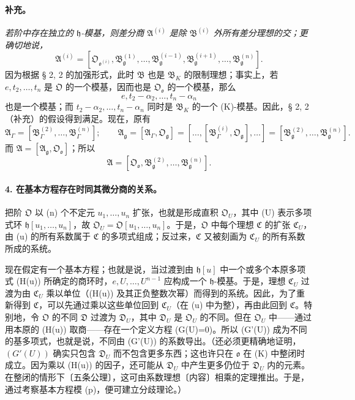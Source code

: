 \documentclass[11pt]{article}
\begin{document}
\paragraph{补充。}
\emph{若阶中存在独立的 \(\mathfrak h\)-模基，则差分商 \(\mathfrak A^{(i)}\) 是除 \(\mathfrak B^{(i)}\) 外所有差分理想的交；更确切地说，}
\[
\mathfrak A^{(i)}=
[\mathfrak O_{\mathfrak o^{(i)}},
\mathfrak B_{\mathfrak g}^{(1)},\ldots,
\mathfrak B_{\mathfrak g}^{(i-1)},
\mathfrak B_{\mathfrak g}^{(i+1)},\ldots,
\mathfrak B_{\mathfrak g}^{(n)}].
\]
因为根据 § 2, 2 的加强形式，此时 \(\mathfrak B\) 也是 \(\mathfrak B_K\) 的限制理想；事实上，若 \(e,t_2,\ldots,t_n\) 是 \(\mathfrak O\) 的一个模基，因而也是 \(\mathfrak O_{\mathfrak o}\) 的一个模基，那么
\[
e,t_2-\alpha_2,\ldots,t_n-\alpha_n
\]
也是一个模基；而 \(t_2-\alpha_2,\ldots,t_n-\alpha_n\) 同时是 \(\mathfrak B_K\) 的一个 (K)-模基。因此，§ 2, 2（补充）的假设得到满足。现在，原有
\[
\mathfrak A_\Gamma=[\mathfrak B_\Gamma^{(2)},\ldots,\mathfrak B_\Gamma^{(n)}];
\qquad
\mathfrak A_\mathfrak g=[\mathfrak A_\Gamma,\mathfrak O_\mathfrak g]
=[\ldots,[\mathfrak B_\Gamma^{(i)},\mathfrak O_\mathfrak g],\ldots]
=[\mathfrak B_\mathfrak g^{(2)},\ldots,\mathfrak B_\mathfrak g^{(n)}].
\]
而 \(\mathfrak A=[\mathfrak A_\mathfrak g,\mathfrak O_{\mathfrak o}]\)；所以
\[
\mathfrak A=[\mathfrak O_{\mathfrak o},\mathfrak B_\mathfrak g^{(2)},\ldots,\mathfrak B_\mathfrak g^{(n)}].
\]

\paragraph{4. 在基本方程存在时同其微分商的关系。}
把阶 \(\mathfrak O\) 以 (n) 个不定元 \(u_1,\ldots,u_n\) 扩张，也就是形成直积 \(\mathfrak O_U\)，其中 (U) 表示多项式环 \(\mathfrak h[u_1,\ldots,u_n]\)，故 \(\mathfrak O_U=\mathfrak O[u_1,\ldots,u_n]\)。于是，\(\mathfrak O\) 中每个理想 \(\mathfrak C\) 的扩张 \(\mathfrak C_U\)，由 (u) 的所有系数属于 \(\mathfrak C\) 的多项式组成；反过来，\(\mathfrak C\) 又被刻画为 \(\mathfrak C_U\) 的所有系数所成的系统。

现在假定有一个基本方程；也就是说，当过渡到由 \(\mathfrak h[u]\) 中一个或多个本原多项式 (H(u)) 所确定的商环时，\(e,U,\ldots,U^{n-1}\) 应构成一个 \(\mathfrak h\)-模基。于是，理想 \(\mathfrak C_U\) 过渡为由 \(\mathfrak C_U\) 乘以单位（(H(u)) 及其正负整数次幂）而得到的系统。因此，为了重新得到 \(\mathfrak C\)，可以先通过乘以这些单位回到 \(\mathfrak C_U\)（在 (u) 中为整），再由此回到 \(\mathfrak C\)。特别地，令 \(\mathfrak O\) 的不同 \(\mathfrak D\) 过渡为 \(\mathfrak D_U\)，其中 \(\mathfrak D_U\) 是 \(\mathfrak O_U\) 的不同。但在 \(\mathfrak O_U\) 中——通过用本原的 (H(u)) 取商——存在一个定义方程 (G(U)=0)。所以 (G'(U)) 成为不同的基多项式，也就是说，不同由 (G'(U)) 的系数导出。（还必须更精确地证明，\((G'(U))\) 确实只包含 \(\mathfrak D_U\) 而不包含更多东西；这也许只在 \(\mathfrak o\) 在 (K) 中整闭时成立。因为乘以 (H(u)) 的因子，还可能从 \(\mathfrak D_U\) 中产生更多仍位于 \(\mathfrak D_U\) 内的元素。在整闭的情形下〔五条公理〕，这可由系数理想〔内容〕相乘的定理推出。于是，通过考察基本方程模 (p)，便可建立分歧理论。）
\end{document}
